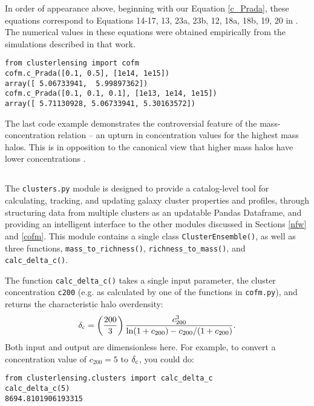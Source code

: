 \documentclass[twocolumn]{aastex6}
\newcommand{\code}{\lstinline[style=codeintext]}
\newcommand{\hcode}{\large\normalfont\texttt} %
\begin{document}
In order of appearance above, beginning with our Equation \ref{c_Prada}, these equations correspond to Equations 14-17, 13, 23a, 23b, 12, 18a, 18b, 19, 20 in \citet{Prada12}. The numerical values in these equations were obtained empirically from the simulations described in that work.
\begin{lstlisting}
from clusterlensing import cofm
cofm.c_Prada([0.1, 0.5], [1e14, 1e15])
array([ 5.06733941,  5.99897362])
cofm.c_Prada([0.1, 0.1, 0.1], [1e13, 1e14, 1e15])
array([ 5.71130928, 5.06733941, 5.30163572])
\end{lstlisting}
The last code example demonstrates the controversial feature of the \citet{Prada12} mass-concentration relation -- an upturn in concentration values for the highest mass halos. This is in opposition to the canonical view that higher mass halos have lower concentrations \citep{nfw96, nfw97, Jing00, Bullock01}.


\subsection{\normalfont{\hcode{clusters.py}}}
\label{clusters}
The \code{clusters.py} module is designed to provide a catalog-level tool for calculating, tracking, and updating galaxy cluster properties and profiles, through structuring data from multiple clusters as an updatable Pandas Dataframe, and providing an intelligent interface to the other modules discussed in Sections \ref{nfw} and \ref{cofm}. This module contains a single class \code{ClusterEnsemble()}, as well as three functions, \code{mass_to_richness()}, \code{richness_to_mass()}, and \code{calc_delta_c()}.

The function \code{calc_delta_c()} takes a single input parameter, the cluster concentration \code{c200} (e.g. as calculated by one of the functions in \code{cofm.py}), and returns the characteristic halo overdensity:
\begin{equation}
\delta_{\rm c} = \left( \frac{200}{3} \right) \frac{c_{200}^3}{\ln(1 + c_{200}) - c_{200}/(1 + c_{200})}.
\end{equation}
Both input and output are dimensionless here. For example, to convert a concentration value of $c_{200} = 5$ to $\delta_{\rm c}$, you could do:
\begin{lstlisting}
from clusterlensing.clusters import calc_delta_c
calc_delta_c(5)
8694.8101906193315
\end{lstlisting}
\end{document}
